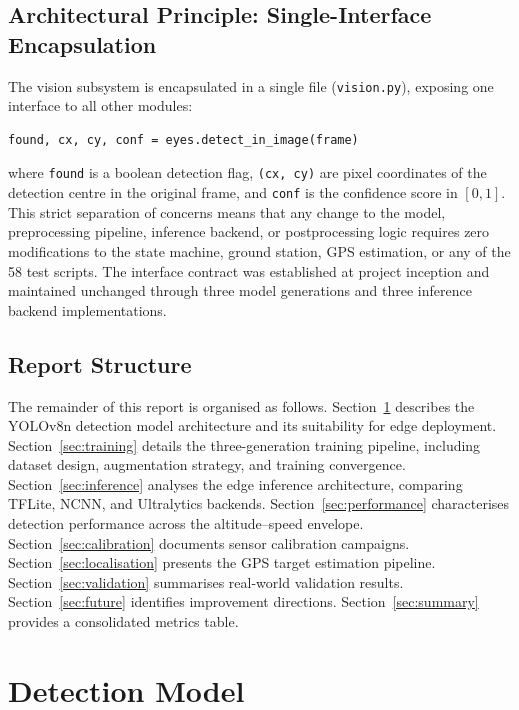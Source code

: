 \documentclass[10pt,a4paper]{article}
\begin{document}
\subsection{Architectural Principle: Single-Interface Encapsulation}

The vision subsystem is encapsulated in a single file (\texttt{vision.py}), exposing one interface to all other modules:

\begin{verbatim}
found, cx, cy, conf = eyes.detect_in_image(frame)
\end{verbatim}

\noindent where \texttt{found} is a boolean detection flag, \texttt{(cx, cy)} are pixel coordinates of the detection centre in the original frame, and \texttt{conf} is the confidence score in $[0, 1]$. This strict separation of concerns means that any change to the model, preprocessing pipeline, inference backend, or postprocessing logic requires zero modifications to the state machine, ground station, GPS estimation, or any of the 58 test scripts. The interface contract was established at project inception and maintained unchanged through three model generations and three inference backend implementations.

\subsection{Report Structure}

The remainder of this report is organised as follows. Section~\ref{sec:model} describes the YOLOv8n detection model architecture and its suitability for edge deployment. Section~\ref{sec:training} details the three-generation training pipeline, including dataset design, augmentation strategy, and training convergence. Section~\ref{sec:inference} analyses the edge inference architecture, comparing TFLite, NCNN, and Ultralytics backends. Section~\ref{sec:performance} characterises detection performance across the altitude--speed envelope. Section~\ref{sec:calibration} documents sensor calibration campaigns. Section~\ref{sec:localisation} presents the GPS target estimation pipeline. Section~\ref{sec:validation} summarises real-world validation results. Section~\ref{sec:future} identifies improvement directions. Section~\ref{sec:summary} provides a consolidated metrics table.


\section{Detection Model}\label{sec:model}
\end{document}
